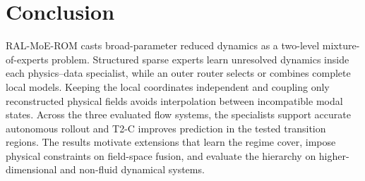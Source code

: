 \section{Conclusion}

RAL-MoE-ROM casts broad-parameter reduced dynamics as a two-level mixture-of-experts problem. Structured sparse experts learn unresolved dynamics inside each physics--data specialist, while an outer router selects or combines complete local models. Keeping the local coordinates independent and coupling only reconstructed physical fields avoids interpolation between incompatible modal states. Across the three evaluated flow systems, the specialists support accurate autonomous rollout and T2-C improves prediction in the tested transition regions. The results motivate extensions that learn the regime cover, impose physical constraints on field-space fusion, and evaluate the hierarchy on higher-dimensional and non-fluid dynamical systems.
